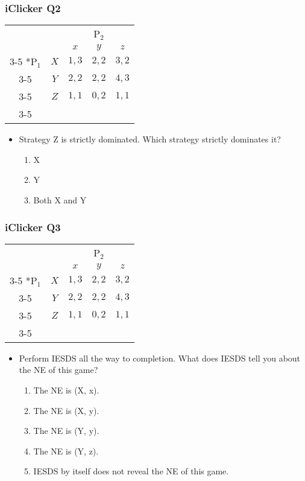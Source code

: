 \begin{frame}
\frametitle{iClicker Q2}
\begin{table}[h]
\centering
\setlength{\extrarowheight}{2pt}
\begin{tabular}{cc|c|c|c|}
	& \multicolumn{1}{c}{} & \multicolumn{3}{c}{P$_2$}\\
	& \multicolumn{1}{c}{} & \multicolumn{1}{c}{$x$} & \multicolumn{1}{c}{$y$} & \multicolumn{1}{c}{$z$} \\\cline{3-5}
	\multirow{3}*{P$_1$}  & $X$ & $1,3$ & $2,2$ & $3,2$ \\\cline{3-5}
	& $Y$ & $2,2$ & $2,2$ & $4,3$\\\cline{3-5}
	& $Z$ & $1,1$ & $0,2$ & $1,1$\\\cline{3-5}
\end{tabular}
\end{table}
\begin{itemize}
\item Strategy Z is strictly dominated. Which strategy strictly dominates it?
\begin{enumerate}[label=\Alph*)]
	\item X
	\item Y
	\item Both X and Y
\end{enumerate}
\end{itemize}
\end{frame}

\begin{frame}
\frametitle{iClicker Q3}
\begin{table}[h]
\centering
\setlength{\extrarowheight}{2pt}
\begin{tabular}{cc|c|c|c|}
	& \multicolumn{1}{c}{} & \multicolumn{3}{c}{P$_2$}\\
	& \multicolumn{1}{c}{} & \multicolumn{1}{c}{$x$} & \multicolumn{1}{c}{$y$} & \multicolumn{1}{c}{$z$} \\\cline{3-5}
	\multirow{3}*{P$_1$}  & $X$ & $1,3$ & $2,2$ & $3,2$ \\\cline{3-5}
	& $Y$ & $2,2$ & $2,2$ & $4,3$\\\cline{3-5}
	& $Z$ & $1,1$ & $0,2$ & $1,1$\\\cline{3-5}
\end{tabular}
\end{table}
\begin{itemize}
\item Perform IESDS all the way to completion. What does IESDS tell you about the NE of this game?
\begin{enumerate}[label=\Alph*)]
	\item The NE is (X, x).
	\item The NE is (X, y).
	\item The NE is (Y, y).
	\item The NE is (Y, z).
	\item IESDS by itself does not reveal the NE of this game.
\end{enumerate}
\end{itemize}
\end{frame}

